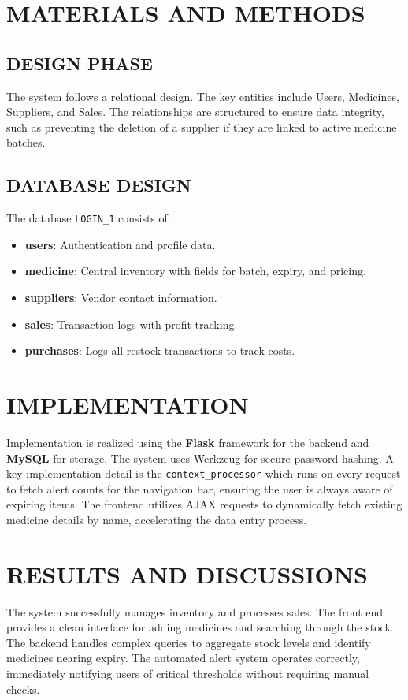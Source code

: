 \documentclass[12pt, a4paper]{report}
\begin{document}
\chapter{MATERIALS AND METHODS}

\section{DESIGN PHASE}
The system follows a relational design. The key entities include Users, Medicines, Suppliers, and Sales. The relationships are structured to ensure data integrity, such as preventing the deletion of a supplier if they are linked to active medicine batches.

\section{DATABASE DESIGN}
The database \texttt{LOGIN\_1} consists of:
\begin{itemize}
    \item \textbf{users}: Authentication and profile data.
    \item \textbf{medicine}: Central inventory with fields for batch, expiry, and pricing.
    \item \textbf{suppliers}: Vendor contact information.
    \item \textbf{sales}: Transaction logs with profit tracking.
    \item \textbf{purchases}: Logs all restock transactions to track costs.
\end{itemize}

\chapter{IMPLEMENTATION}
Implementation is realized using the \textbf{Flask} framework for the backend and \textbf{MySQL} for storage. The system uses Werkzeug for secure password hashing. A key implementation detail is the \texttt{context\_processor} which runs on every request to fetch alert counts for the navigation bar, ensuring the user is always aware of expiring items. The frontend utilizes AJAX requests to dynamically fetch existing medicine details by name, accelerating the data entry process.

\chapter{RESULTS AND DISCUSSIONS}
The system successfully manages inventory and processes sales. The front end provides a clean interface for adding medicines and searching through the stock. The backend handles complex queries to aggregate stock levels and identify medicines nearing expiry. The automated alert system operates correctly, immediately notifying users of critical thresholds without requiring manual checks.
\end{document}
